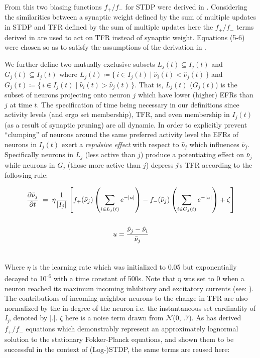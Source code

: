 \documentclass[10pt,letterpaper]{article}
\begin{document}
From this two biasing functions $f_+/f_-$ for STDP were derived in \cite{gilson2011stability}. Considering the similarities between a synaptic weight defined by the sum of multiple updates in STDP and TFR defined by the sum of multiple updates here the  $f_+/f_-$ terms derived in \cite{gilson2011stability} are used to act on TFR instead of synaptic weight. Equations (5-6) were chosen so as to satisfy the assumptions of the derivation in \cite{gilson2011stability}.

 We further define two mutually exclusive subsets $L_j(t) \subseteq I_j(t)$ and $G_j(t) \subseteq I_j(t)$ where $L_j(t) \coloneqq \{\,i \in I_j(t) \;|\; \hat{\nu}_i(t) < \hat{\nu}_j(t)\,\}$ and $G_j(t) \coloneqq \{\,i \in I_j(t) \;|\; \hat{\nu}_i(t) > \hat{\nu}_j(t)\,\}$. That is, $L_j(t)$ ($G_j(t)$) is the subset of neurons projecting onto neuron $j$ which have lower (higher) EFRs than $j$ at time $t$. The specification of time being necessary in our definitions since activity levels (and ergo set membership), TFR, and even membership in $I_j(t)$ (as a result of synaptic pruning) are all dynamic. In order to explicitly prevent ``clumping'' of neurons around the same preferred activity level the EFRs of neurons in $I_j(t)$ exert a \emph{repulsive effect} with respect to $\hat{\nu}_j$ which influences $\bar{\nu}_j$. Specifically neurons in $L_j$ (less active than $j$) produce a potentiating effect on  $\bar{\nu}_j$ while neurons in $G_j$ (those more active than $j$) depress \emph{j}'s TFR according to the following rule:
 
 \begin{gather}
	 \frac{\partial \bar{\nu}_j}{\partial t} \;=\; \eta \frac{1}{|I_j|} \left[ f_+(\bar{\nu}_j) \left(\sum_{i \in L_j(t)} e^{-|u|}\right) - f_-(\bar{\nu}_j) \left(\sum_{i \in G_j(t)} e^{-|u|}\right) + \zeta \right]  \\ \notag \\
	 u = \frac{\hat{\nu}_j - \hat{\nu}_i}{\bar{\nu}_j} \\ \notag
 \end{gather}

Where $\eta$ is the learning rate which was initialized to 0.05 but exponentially decayed to 10\textsuperscript{-6} with a time constant of 500s. Note that $\eta$ was set to 0 when a neuron reached its maximum incoming inhibitory and excitatory currents (see: ). The contributions of incoming neighbor neurons to the change in TFR are also normalized by the in-degree of the neuron i.e. the instantaneous set cardinality of \emph{I\textsubscript{j}}, denoted by $|.|$. $\zeta$ here is a noise term drawn from $\mathcal{N}$(0, .7). As \cite{gilson2011stability} has derived $f_+/f_-$ equations which demonstrably represent an approximately lognormal solution to the stationary Fokker-Planck equations, and shown them to be successful in the context of (Log-)STDP, the same terms are reused here:
		 
\end{document}
